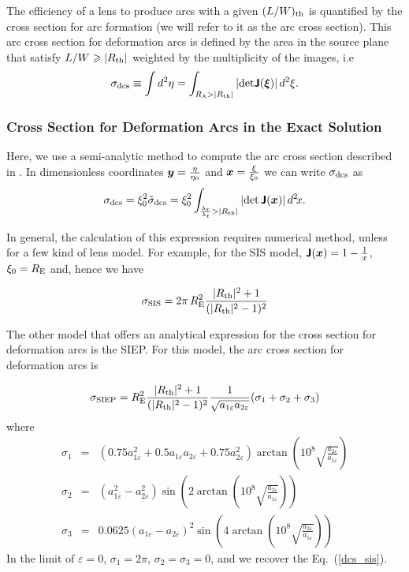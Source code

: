 \documentclass[useAMS,usenatbib]{mn2e}
\begin{document}
The efficiency of a lens to produce arcs with a given $(L/W)_{\rm th}$  is quantified by the cross section for arc formation (we will refer to it as the arc cross section). This arc cross section for deformation arcs is defined by the area in the source plane that satisfy $ L/W  \geq |R_{\rm th}|$ weighted by the multiplicity of the images, i.e
\begin{equation}
\sigma_{\rm dcs} \equiv \int d^2\eta =\int_{ R_\lambda > |R_{\rm th}|} \left |\rmn{det}\mathbfss{J}(\bmath{\xi}) \right| d^2\xi. \label{dcs_dim}
\end{equation}

\subsubsection{Cross Section for Deformation Arcs in the Exact Solution}
Here, we use a semi-analytic method to compute the arc cross section described in \citet{dm_2011}. In dimensionless coordinates $ \bmath{y}=\frac{\eta}{\eta_0}$ and $\bmath{x}=\frac{\xi}{\xi_0}$ we can write $\sigma_{\rm dcs}$ as
\begin{equation}
\sigma_{\rm dcs} = \xi_0^2\tilde{\sigma}_{\rm dcs}= \xi_0^2 \int_{ \frac{\lambda_r}{\lambda_t} > |R_{\rm th}|} \left |\rmn{det}\,\mathbfss{J}(\bmath{x}) \right| d^2\!x. \label{dcs_dimensionless}
\end{equation}

In general, the calculation of this expression requires numerical method, unless for a few kind of lens model.  For example, for the SIS model,
$\mathbfss{J}(\bmath{x})=1-\frac{1}{x}$, $\xi_0=R_{\rm E}$ and, hence we have

\begin{equation}
\sigma_{\rm SIS}=2\pi\,R^2_{\rm E} \frac{|R_{\rm th}|^2+1}{(|R_{\rm th}|^2-1)^2} \label{dcs_sis}
\end{equation}

The other  model that offers an analytical expression for the cross section for deformation arcs is the SIEP. For this model, the arc cross section for deformation arcs is

\begin{equation}
\sigma_{\rm SIEP}=R^2_{\rm E}\frac{|R_{\rm th}|^2+1}{(|R_{\rm th}|^2-1)^2}\frac{1}{\sqrt{a_{1\varepsilon} a_{2\varepsilon}}} (\sigma_1+\sigma_2
+\sigma_3)
\end{equation}
where
\begin{eqnarray*}
\sigma_1 &=& (0.75a^2_{1\varepsilon}+0.5 a_{1\varepsilon}a_{2\varepsilon}+0.75 a^2_{2\varepsilon})\arctan{\left(10^{8}\sqrt{\frac{a_{2\varepsilon}}{a_{1\varepsilon}}} \right)}\\
\sigma_2 &=& (a^2_{1\varepsilon}-a^ 2_{2\varepsilon})\sin{\left(2\arctan{\left( 10^{8}\sqrt{\frac{a_{2\varepsilon}}{a_{1\varepsilon}}}\right)}\right)} \\
\sigma_3&=& 0.0625(a_{1\varepsilon}-a_{2\varepsilon})^2\sin{\left(4\arctan{\left(10^{8}\sqrt{\frac{a_{2\varepsilon}}{a_{1\varepsilon}}} \right)}\right)}
\end{eqnarray*}
In the limit of $\varepsilon=0$, $\sigma_1=2\pi$, $\sigma_2=\sigma_3=0$, and we recover the Eq.~(\ref{dcs_sis}).
\end{document}
